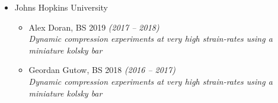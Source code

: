 \documentclass[a4paper,10pt, oneside]{article}
\begin{document}
\begin{itemize}[wide, labelwidth=!, labelindent=-1em]
\begin{itemize}[wide, labelwidth=!, labelindent=0em]
			\end{itemize}
		ETH Z\"{u}rich
		\begin{itemize}[wide, labelwidth=!, labelindent=0em]
			\item Mathieu Brodmann, BS 2021 \textit{(Bachelor thesis)} \hfill \textit{(February -- July 2021)} \\
			\textit{An in-situ experiment to measure polarization switching in ferroelectric crystals}
			\item Ben Sp\"{o}ttling, BS 2020 \textit{(Bachelor thesis)} \hfill \textit{(February -- May 2020)} \\
			\textit{Mapping displacement fields in truss-based metamaterials using digital image analysis}
		\end{itemize} 
		\vspace*{0.5em}
		\item[]Johns Hopkins University
		\begin{itemize}[wide, labelwidth=!, labelindent=0em]
			\item Alex Doran, BS 2019 \hfill \textit{(2017 -- 2018)} \\
			\textit{Dynamic compression experiments at very high strain-rates using a miniature kolsky bar}
			\item Geordan Gutow, BS 2018 \hfill \textit{(2016 -- 2017)} \\
			\textit{Dynamic compression experiments at very high strain-rates using a miniature kolsky bar}
		\end{itemize}
	\end{itemize}
	
\end{document}
